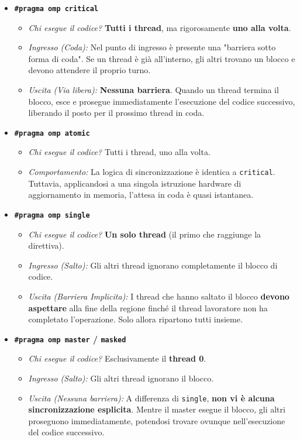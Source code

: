 \begin{itemize}
    \item \textbf{\texttt{\#pragma omp critical}}
    \begin{itemize}
        \item \textit{Chi esegue il codice?} \textbf{Tutti i thread}, ma rigorosamente \textbf{uno alla volta}.
        \item \textit{Ingresso (Coda):} Nel punto di ingresso è presente una "barriera sotto forma di coda". Se un thread è già all'interno, gli altri trovano un blocco e devono attendere il proprio turno.
        \item \textit{Uscita (Via libera):} \textbf{Nessuna barriera}. Quando un thread termina il blocco, esce e prosegue immediatamente l'esecuzione del codice successivo, liberando il posto per il prossimo thread in coda.
    \end{itemize}

    \item \textbf{\texttt{\#pragma omp atomic}}
    \begin{itemize}
        \item \textit{Chi esegue il codice?} Tutti i thread, uno alla volta.
        \item \textit{Comportamento:} La logica di sincronizzazione è identica a \texttt{critical}. Tuttavia, applicandosi a una singola istruzione hardware di aggiornamento in memoria, l'attesa in coda è quasi istantanea.
    \end{itemize}

    \item \textbf{\texttt{\#pragma omp single}}
    \begin{itemize}
        \item \textit{Chi esegue il codice?} \textbf{Un solo thread} (il primo che raggiunge la direttiva).
        \item \textit{Ingresso (Salto):} Gli altri thread ignorano completamente il blocco di codice.
        \item \textit{Uscita (Barriera Implicita):} I thread che hanno saltato il blocco \textbf{devono aspettare} alla fine della regione finché il thread lavoratore non ha completato l'operazione. Solo allora ripartono tutti insieme.
    \end{itemize}

    \item \textbf{\texttt{\#pragma omp master} / \texttt{masked}}
    \begin{itemize}
        \item \textit{Chi esegue il codice?} Esclusivamente il \textbf{thread 0}.
        \item \textit{Ingresso (Salto):} Gli altri thread ignorano il blocco.
        \item \textit{Uscita (Nessuna barriera):} A differenza di \texttt{single}, \textbf{non vi è alcuna sincronizzazione esplicita}. Mentre il master esegue il blocco, gli altri proseguono immediatamente, potendosi trovare ovunque nell'esecuzione del codice successivo.
    \end{itemize}
\end{itemize}
